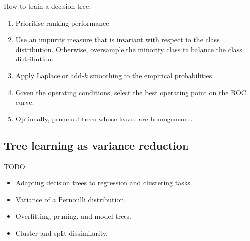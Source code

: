 How to train a decision tree:
\begin{enumerate}
  \item Prioritise ranking performance
  \item Use an impurity measure that is invariant with respect to the class distribution.
        Otherwise, oversample the minority class to balance the class distribution.
  \item Apply Laplace or add-$k$ smoothing to the empirical probabilities.
  \item Given the operating conditions, select the best operating point on the ROC curve.
  \item Optionally, prune subtrees whose leaves are homogeneous.
\end{enumerate}

\subsection{Tree learning as variance reduction}

TODO:

\begin{itemize}
  \item Adapting decision trees to regression and clustering tasks.
  \item Variance of a Bernoulli distribution.
  \item Overfitting, pruning, and model trees.
  \item Cluster and split dissimilarity.
\end{itemize}
